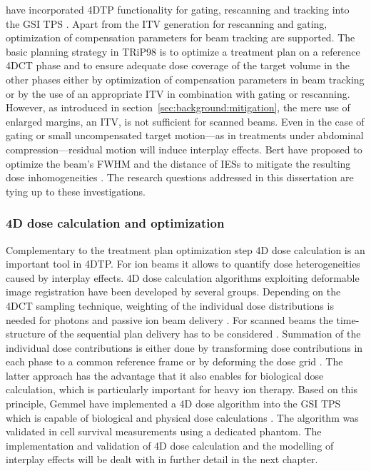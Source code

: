 \citet{Bert2007} have incorporated \ac{4DTP} functionality for gating,
rescanning and tracking into the \ac{GSI} \acl{TPS} \TRiPNE. Apart
from the \ac{ITV} generation for rescanning and gating, optimization
of compensation parameters for beam tracking are supported. The basic
planning strategy in TRiP98 is to optimize a treatment plan on a
reference \ac{4DCT} phase and to ensure adequate dose coverage of the
target volume in the other phases either by optimization of
compensation parameters in beam tracking or by the use of an appropriate
\ac{ITV} in combination with gating or rescanning. However, as
introduced in section~\ref{sec:background:mitigation}, the mere use of
enlarged margins, \ie an \ac{ITV}, is not sufficient for scanned
beams. Even in the case of gating or small uncompensated target
motion---as in treatments under abdominal compression---residual
motion will induce interplay effects. Bert \etal have proposed to
optimize the beam's \ac{FWHM} and the distance of \aclp{IES} to
mitigate the resulting dose inhomogeneities \citep{Bert2009}. The
research questions addressed in this dissertation are tying up to
these investigations.

\subsubsection{\acs{4D} dose calculation and optimization}
Complementary to the treatment plan optimization step \ac{4D}
dose calculation is an important tool in \ac{4DTP}. For ion beams it
allows to quantify dose heterogeneities caused by interplay
effects. \ac{4D} dose calculation algorithms exploiting deformable
image registration have been developed by several groups. Depending on
the \ac{4DCT} sampling technique, weighting of the individual dose
distributions is needed for photons and passive ion beam delivery
\citep{Rietzel2005}. For scanned beams the time-structure of the
sequential plan delivery has to be considered
\citep{Bert2007,Paganetti2004}. Summation of the individual dose
contributions is either done by transforming dose contributions in
each phase to a common reference frame \citep{Bert2007} or by
deforming the dose grid \citep{Knopf2010b}. The latter approach has
the advantage that it also enables for biological dose calculation,
which is particularly important for heavy ion therapy. Based on this
principle, Gemmel \etal have implemented a \ac{4D} dose algorithm into
the \ac{GSI} \ac{TPS} which is capable of biological and physical dose
calculations \citep{Gemmel2011}. The algorithm was validated in cell
survival measurements using a dedicated phantom. The implementation
and validation of \ac{4D} dose calculation and the modelling of
interplay effects will be dealt with in further detail in the next
chapter.


